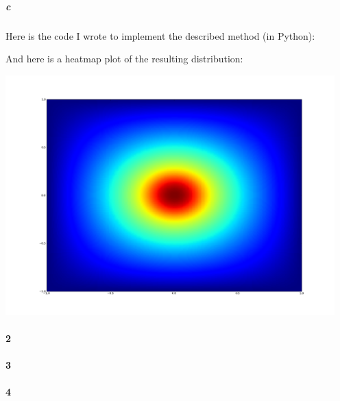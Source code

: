 \documentclass{article}
\begin{document}
\subparagraph{c}

Here is the code I wrote to implement the described method (in Python):

\pagebreak


And here is a heatmap plot of the resulting distribution:

\begin{center}
\includegraphics[width=5in]{prob1_result.png}
\end{center}

\paragraph{2}

\paragraph{3}

\paragraph{4}
\end{document}
